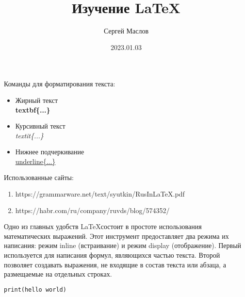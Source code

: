 \documentclass[12pt]{article}        %
\title{Изучение \LaTeX} %
\author{Сергей Маслов}  %
\date{2023.01.03}       %
\begin{document}
\maketitle %

Команды для форматирования текста:
\begin{itemize} %
    \item Жирный текст \textbf{\\textbf\{...\}}
    \item Курсивный текст \textit{\\textit\{...\}}
    \item Нижнее подчеркивание \underline{\\underline\{...\}}
\end{itemize}

Использованные сайты:
\begin{enumerate} %
    \item https://grammarware.net/text/syutkin/RusInLaTeX.pdf
    \item https://habr.com/ru/company/ruvds/blog/574352/
\end{enumerate}

Одно из главных удобств \LaTeX состоит в простоте использования математических выражений.
Этот инструмент предоставляет два режима их написания: режим inline (встраивание) и режим display (отображение). Первый используется для написания формул, являющихся частью текста. Второй позволяет создавать выражения, не входящие в состав текста или абзаца, а размещаемые на отдельных строках.
\begin{verbatim}
print(hello world)
\end{verbatim}
\end{document}
